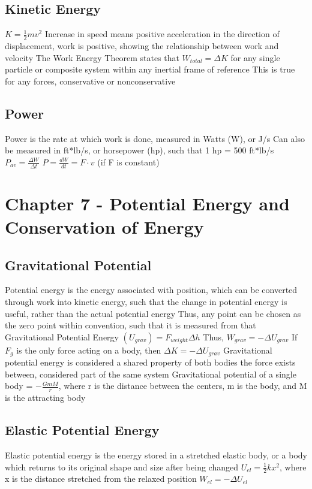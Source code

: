 \documentclass[11 pt, twoside]{article}
\newenvironment{outline*}
{
	\begin{outline}[enumerate]
	}
	{\end{outline}
}
\begin{document}
\subsection{Kinetic Energy}
\begin{outline*}
\1 $K = \frac{1}{2}mv^2$
\1 Increase in speed means positive acceleration in the direction of displacement, work is positive, showing the relationship between work and velocity
\1 The Work Energy Theorem states that $W_{total} = \Delta K$ for any single particle or composite system within any inertial frame of reference
\2 This is true for any forces, conservative or nonconservative
\end{outline*}
\subsection{Power}
\begin{outline*}
\1 Power is the rate at which work is done, measured in Watts (W), or J/s
\2 Can also be measured in ft*lb/s, or horsepower (hp), such that 1 hp = 500 ft*lb/s
\1 $P_{av} = \frac{\Delta W}{\Delta t}$
\1 $P = \frac{dW}{dt} = F \cdot v$ (if F is constant)
\end{outline*}
\section{Chapter 7 - Potential Energy and Conservation of Energy}
\subsection{Gravitational Potential}
\begin{outline*}
\1 Potential energy is the energy associated with position, which can be converted through work into kinetic energy, such that the change in potential energy is useful, rather than the actual potential energy
\2 Thus, any point can be chosen as the zero point within convention, such that it is measured from that
\1 Gravitational Potential Energy $(U_{grav}) = F_{weight}\Delta h$
\2 Thus, $W_{grav} = -\Delta U_{grav}$
\2 If $F_g$ is the only force acting on a body, then $\Delta K = -\Delta U_{grav}$
\2 Gravitational potential energy is considered a shared property of both bodies the force exists between, considered part of the same system
\2 Gravitational potential of a single body = $-\frac{GmM}{r}$, where r is the distance between the centers, m is the body, and M is the attracting body
\end{outline*}
\subsection{Elastic Potential Energy}
\begin{outline*}
\1 Elastic potential energy is the energy stored in a stretched elastic body, or a body which returns to its original shape and size after being changed
\2 $U_{el} = \frac{1}{2}kx^2$, where x is the distance stretched from the relaxed position
\2 $W_{el} = -\Delta U_{el}$
\end{outline*}
\end{document}
